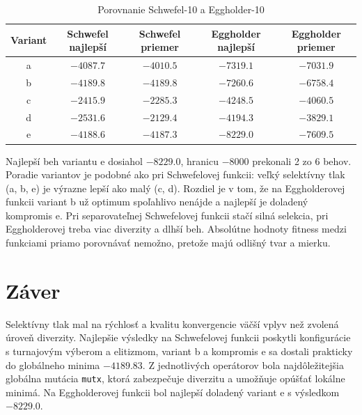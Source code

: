 \documentclass[11pt,a4paper]{article}
\begin{document}
\begin{table}[H]
\centering
\caption{Porovnanie Schwefel-10 a Eggholder-10}
\begin{tabular}{ccccc}
\toprule
Variant & Schwefel najlepší & Schwefel priemer & Eggholder najlepší & Eggholder priemer \\
\midrule
a & $-4087.7$ & $-4010.5$ & $-7319.1$ & $-7031.9$ \\
b & $-4189.8$ & $-4189.8$ & $-7260.6$ & $-6758.4$ \\
c & $-2415.9$ & $-2285.3$ & $-4248.5$ & $-4060.5$ \\
d & $-2531.6$ & $-2129.4$ & $-4194.3$ & $-3829.1$ \\
e & $-4188.6$ & $-4187.3$ & $-8229.0$ & $-7609.5$ \\
\bottomrule
\end{tabular}
\end{table}

Najlepší beh variantu e dosiahol $-8229.0$, hranicu $-8000$ prekonali 2 zo 6
behov. Poradie variantov je podobné ako pri Schwefelovej funkcii: veľký
selektívny tlak (a, b, e) je výrazne lepší ako malý (c, d). Rozdiel je v tom, že
na Eggholderovej funkcii variant b už optimum spoľahlivo nenájde a najlepší je
doladený kompromis e. Pri separovateľnej Schwefelovej funkcii stačí silná
selekcia, pri Eggholderovej treba viac diverzity a dlhší beh. Absolútne hodnoty
fitness medzi funkciami priamo porovnávať nemožno, pretože majú odlišný tvar a mierku.

\section{Záver}

Selektívny tlak mal na rýchlosť a kvalitu konvergencie väčší vplyv než
zvolená úroveň diverzity. Najlepšie výsledky na Schwefelovej funkcii poskytli
konfigurácie s turnajovým výberom a elitizmom, variant b a kompromis e sa dostali
prakticky do globálneho minima $-4189.83$. Z jednotlivých operátorov bola
najdôležitejšia globálna mutácia \texttt{mutx}, ktorá zabezpečuje diverzitu a
umožňuje opúšťať lokálne minimá. Na Eggholderovej funkcii bol najlepší doladený
variant e s výsledkom $-8229.0$.
\end{document}
